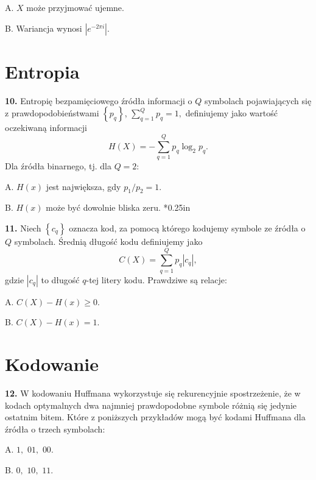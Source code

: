 \documentclass[journal,9pt,final,a4paper]{IEEEtran}%
\begin{document}
A. $X$ mo\.{z}e przyjmowa\'{c} ujemne.

B. Wariancja wynosi $\left\vert e^{-2\pi i}\right\vert $.

\section{Entropia}

\textbf{10. }Entropi\k{e} bezpami\k{e}ciowego \'{z}r\'{o}d\l a informacji o
$Q$ symbolach pojawiaj\k{a}cych si\k{e} z prawdopodobie\'{n}stwami $\left\{
p_{q}\right\}  $, $\sum_{q=1}^{Q}p_{q}=1,$ definiujemy jako warto\'{s}\'{c}
oczekiwan\k{a} informacji%
\[
H\left(  X\right)  =-\sum_{q=1}^{Q}p_{q}\log_{2}p_{q}.
\]
Dla \'{z}r\'{o}d\l a binarnego, tj. dla $Q=2$:

A. $H\left(  x\right)  $ jest najwi\k{e}ksza, gdy $p_{1}/p_{2}=1.$

B. $H\left(  x\right)  $ mo\.{z}e by\'{c} dowolnie bliska zeru.\vspace
*{0.25in}

\vspace*{0.25in}\textbf{11. }Niech $\left\{  c_{q}\right\}  $ oznacza kod, za
pomoc\k{a} kt\'{o}rego kodujemy symbole ze \'{z}r\'{o}d\l a o $Q$ symbolach.
\'{S}redni\k{a} d\l ugo\'{s}\'{c} kodu definiujemy jako%
\[
C\left(  X\right)  =\sum_{q=1}^{Q}p_{q}\left\vert c_{q}\right\vert ,
\]
gdzie $\left\vert c_{q}\right\vert $ to d\l ugo\'{s}\'{c} $q$-tej litery kodu.
Prawdziwe s\k{a} relacje:

A. $C\left(  X\right)  -H\left(  x\right)  \geq0.$

B. $C\left(  X\right)  -H\left(  x\right)  =1.$

\section{Kodowanie}

\vspace*{0.25in}\textbf{12. }W kodowaniu Huffmana wykorzystuje si\k{e}
rekurencyjnie spostrze\.{z}enie, \.{z}e w kodach optymalnych dwa najmniej
prawdopodobne symbole r\'{o}\.{z}ni\k{a} si\k{e} jedynie ostatnim bitem.
Kt\'{o}re z poni\.{z}szych przyk\l ad\'{o}w mog\k{a} by\'{c} kodami Huffmana
dla \'{z}r\'{o}d\l a o trzech symbolach:

A. $1,$ $01,$ $00.$

B. $0,$ $10,$ $11.$

\begin{center}
\vspace*{3in}
\end{center}
\end{document}
